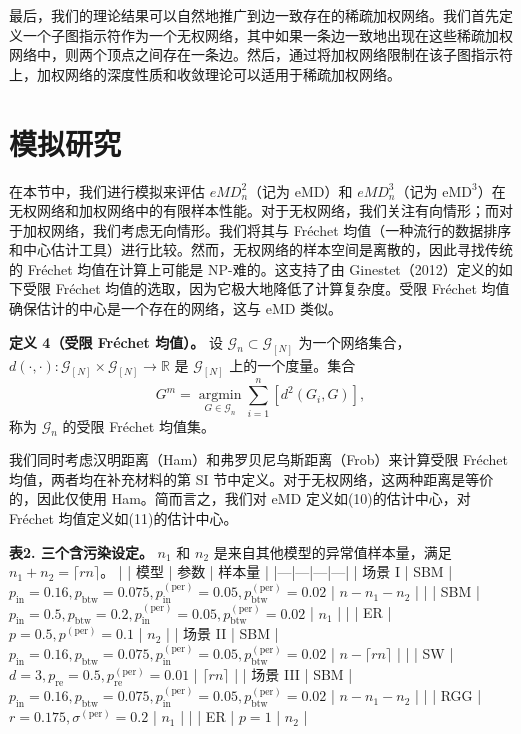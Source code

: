 \documentclass[
  10
]{article}
\begin{document}
最后，我们的理论结果可以自然地推广到边一致存在的稀疏加权网络。我们首先定义一个子图指示符作为一个无权网络，其中如果一条边一致地出现在这些稀疏加权网络中，则两个顶点之间存在一条边。然后，通过将加权网络限制在该子图指示符上，加权网络的深度性质和收敛理论可以适用于稀疏加权网络。

\section{模拟研究}

在本节中，我们进行模拟来评估 $eMD_n^2$（记为 eMD）和 $eMD_n^3$（记为 $\mathrm{eMD}^3$）在无权网络和加权网络中的有限样本性能。对于无权网络，我们关注有向情形；而对于加权网络，我们考虑无向情形。我们将其与 Fréchet 均值（一种流行的数据排序和中心估计工具）进行比较。然而，无权网络的样本空间是离散的，因此寻找传统的 Fréchet 均值在计算上可能是 NP-难的。这支持了由 Ginestet（2012）定义的如下受限 Fréchet 均值的选取，因为它极大地降低了计算复杂度。受限 Fréchet 均值确保估计的中心是一个存在的网络，这与 eMD 类似。

\textbf{定义 4（受限 Fréchet 均值）。} 设 $\mathcal{G}_n\subset\mathcal{G}_{[N]}$ 为一个网络集合，$d(\cdot,\cdot):\mathcal{G}_{[N]}\times\mathcal{G}_{[N]}\to\mathbb{R}$ 是 $\mathcal{G}_{[N]}$ 上的一个度量。集合
$$
G^m = \operatorname*{argmin}_{G\in\mathcal{G}_n} \sum_{i=1}^n [d^2(G_i,G)],
$$
称为 $\mathcal{G}_n$ 的受限 Fréchet 均值集。

我们同时考虑汉明距离（Ham）和弗罗贝尼乌斯距离（Frob）来计算受限 Fréchet 均值，两者均在补充材料的第 SI 节中定义。对于无权网络，这两种距离是等价的，因此仅使用 Ham。简而言之，我们对 eMD 定义如(10)的估计中心，对 Fréchet 均值定义如(11)的估计中心。

\textbf{表2. 三个含污染设定。} $n_1$ 和 $n_2$ 是来自其他模型的异常值样本量，满足 $n_1+n_2=\lceil rn\rceil$。
| | 模型 | 参数 | 样本量 |
|---|---|---|---|
| 场景 I | SBM | $p_{\text{in}}=0.16,p_{\text{btw}}=0.075,p_{\text{in}}^{(\text{per})}=0.05,p_{\text{btw}}^{(\text{per})}=0.02$ | $n-n_1-n_2$ |
| | SBM | $p_{\text{in}}=0.5,p_{\text{btw}}=0.2,p_{\text{in}}^{(\text{per})}=0.05,p_{\text{btw}}^{(\text{per})}=0.02$ | $n_1$ |
| | ER | $p=0.5,p^{(\text{per})}=0.1$ | $n_2$ |
| 场景 II | SBM | $p_{\text{in}}=0.16,p_{\text{btw}}=0.075,p_{\text{in}}^{(\text{per})}=0.05,p_{\text{btw}}^{(\text{per})}=0.02$ | $n-\lceil rn\rceil$ |
| | SW | $d=3,p_{\text{re}}=0.5,p_{\text{re}}^{(\text{per})}=0.01$ | $\lceil rn\rceil$ |
| 场景 III | SBM | $p_{\text{in}}=0.16,p_{\text{btw}}=0.075,p_{\text{in}}^{(\text{per})}=0.05,p_{\text{btw}}^{(\text{per})}=0.02$ | $n-n_1-n_2$ |
| | RGG | $r=0.175,\sigma^{(\text{per})}=0.2$ | $n_1$ |
| | ER | $p=1$ | $n_2$ |
\end{document}
